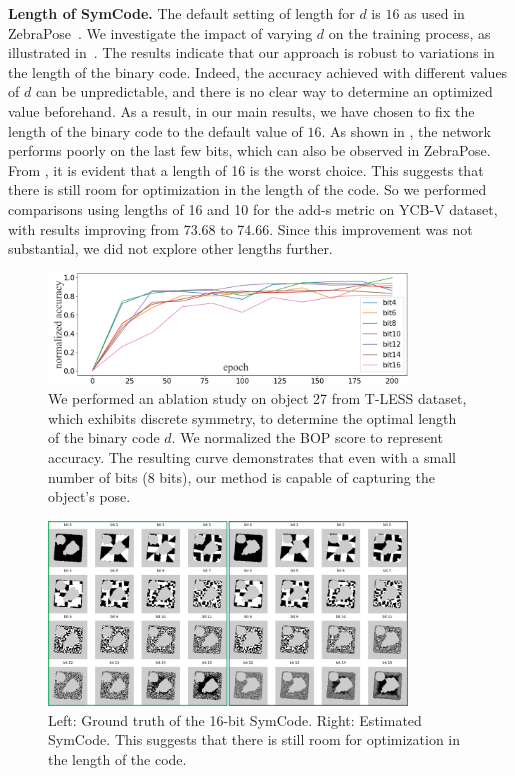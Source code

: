 \textbf{Length of SymCode.} The default setting of length for $d$ is $16$ as used in ZebraPose~\cite{su2022zebrapose}. We investigate the impact of varying $d$ on the training process, as illustrated in~. The results indicate that our approach is robust to variations in the length of the binary code. Indeed, the accuracy achieved with different values of $d$ can be unpredictable, and there is no clear way to determine an optimized value beforehand. As a result, in our main results, we have chosen to fix the length of the binary code to the default value of $16$. As shown in , the network performs poorly on the last few bits, which can also be observed in ZebraPose. From , it is evident that a length of 16 is the worst choice. This suggests that there is still room for optimization in the length of the code. So we performed comparisons using lengths of 16 and 10 for the add-s metric on YCB-V dataset, with results improving from 73.68 to 74.66. Since this improvement was not substantial, we did not explore other lengths further.

\begin{figure}[th]
        \centerline{\includegraphics[width=0.85\textwidth]{figure/symnet/ablation_bit.jpg}}
        \caption{We performed an ablation study on object 27 from T-LESS dataset, which exhibits discrete symmetry, to determine the optimal length of the binary code $d$. We normalized the BOP score to represent accuracy. The resulting curve demonstrates that even with a small number of bits (8 bits), our method is capable of capturing the object's pose.}
        \label{fig:ablation_bit}
\end{figure}

\begin{figure}[th]
        \centerline{\includegraphics[width=0.85\textwidth]{figure/symnet/compare_gt_est.jpg}}
        \caption{Left: Ground truth of the 16-bit SymCode. Right: Estimated SymCode. This suggests that there is still room for optimization in the length of the code.}
        \label{fig:compare_gt_est}
\end{figure}

